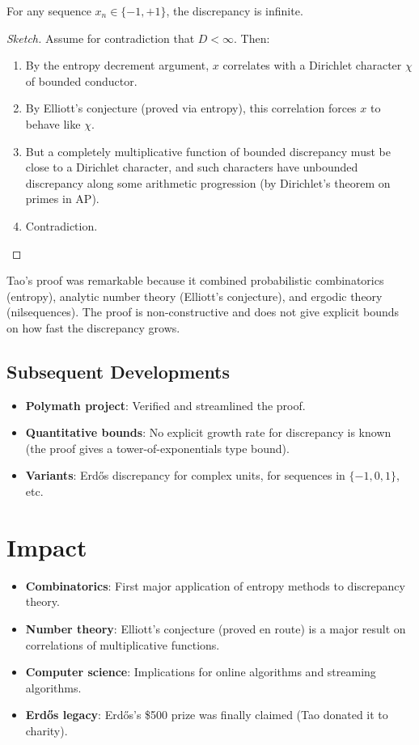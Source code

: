 \begin{theorem}
For any sequence $x_n \in \{-1, +1\}$, the discrepancy is infinite.
\end{theorem}

\begin{proof}[Sketch]
Assume for contradiction that $D < \infty$. Then:
\begin{enumerate}
\item By the entropy decrement argument, $x$ correlates with a Dirichlet character $\chi$ of bounded conductor.
\item By Elliott's conjecture (proved via entropy), this correlation forces $x$ to behave like $\chi$.
\item But a completely multiplicative function of bounded discrepancy must be close to a Dirichlet character, and such characters have unbounded discrepancy along some arithmetic progression (by Dirichlet's theorem on primes in AP).
\item Contradiction.
\end{enumerate}
\end{proof}

\begin{highlightbox}
Tao's proof was remarkable because it combined probabilistic combinatorics (entropy), analytic number theory (Elliott's conjecture), and ergodic theory (nilsequences). The proof is non-constructive and does not give explicit bounds on how fast the discrepancy grows.
\end{highlightbox}

\subsection{Subsequent Developments}
\begin{itemize}
\item \textbf{Polymath project}: Verified and streamlined the proof.
\item \textbf{Quantitative bounds}: No explicit growth rate for discrepancy is known (the proof gives a tower-of-exponentials type bound).
\item \textbf{Variants}: Erdős discrepancy for complex units, for sequences in $\{-1,0,1\}$, etc.
\end{itemize}

\section{Impact}
\begin{itemize}
\item \textbf{Combinatorics}: First major application of entropy methods to discrepancy theory.
\item \textbf{Number theory}: Elliott's conjecture (proved en route) is a major result on correlations of multiplicative functions.
\item \textbf{Computer science}: Implications for online algorithms and streaming algorithms.
\item \textbf{Erdős legacy}: Erdős's \$500 prize was finally claimed (Tao donated it to charity).
\end{itemize}

